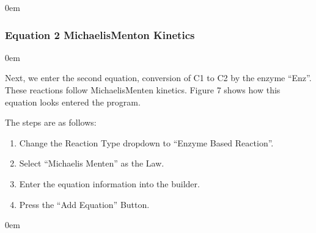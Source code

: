 \documentclass[letterpaper,10pt,english]{sphinxmanual}
\begin{document}

\begin{DUlineblock}{0em}
\item[] 
\end{DUlineblock}


\subsubsection{Equation 2 \sphinxhyphen{} Michaelis\sphinxhyphen{}Menton Kinetics}
\label{\detokenize{pages/tutorial_sc/createEquations:equation-2-michaelis-menton-kinetics}}

\begin{DUlineblock}{0em}
\item[] 
\end{DUlineblock}

\sphinxAtStartPar
Next, we enter the second equation, conversion of C1 to C2 by the enzyme “Enz”.
These reactions follow Michaelis\sphinxhyphen{}Menten kinetics. Figure 7 shows how this
equation looks entered the program.

\sphinxAtStartPar
The steps are as follows:
\begin{enumerate}
%
\item {} 
\sphinxAtStartPar
Change the Reaction Type dropdown to “Enzyme Based Reaction”.

\item {} 
\sphinxAtStartPar
Select “Michaelis Menten” as the Law.

\item {} 
\sphinxAtStartPar
Enter the equation information into the builder.

\item {} 
\sphinxAtStartPar
Press the “Add Equation” Button.

\end{enumerate}


\begin{DUlineblock}{0em}
\item[] 
\end{DUlineblock}
\end{document}
